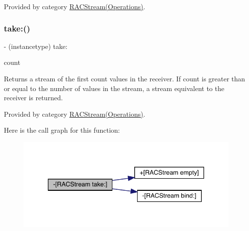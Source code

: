 Provided by category \mbox{\hyperlink{category_r_a_c_stream_07_operations_08_af0264b38dc4acd9334d2e42b1ce21b05}{R\+A\+C\+Stream(\+Operations)}}.

\mbox{\label{interface_r_a_c_stream_af0264b38dc4acd9334d2e42b1ce21b05}} 
\subsubsection{\texorpdfstring{take\+:()}{take:()}\hspace{0.1cm}{\footnotesize\ttfamily [3/3]}}
{\footnotesize\ttfamily -\/ (instancetype) take\+: \begin{DoxyParamCaption}\item[{(N\+S\+U\+Integer)}]{count }\end{DoxyParamCaption}}

Returns a stream of the first {\ttfamily count} values in the receiver. If {\ttfamily count} is greater than or equal to the number of values in the stream, a stream equivalent to the receiver is returned. 

Provided by category \mbox{\hyperlink{category_r_a_c_stream_07_operations_08_af0264b38dc4acd9334d2e42b1ce21b05}{R\+A\+C\+Stream(\+Operations)}}.

Here is the call graph for this function\+:\nopagebreak
\begin{figure}[H]
\begin{center}
\leavevmode
\includegraphics[width=329pt]{interface_r_a_c_stream_af0264b38dc4acd9334d2e42b1ce21b05_cgraph}
\end{center}
\end{figure}
\mbox{\label{interface_r_a_c_stream_ac19d57150840e93112646eef310c2489}} 
